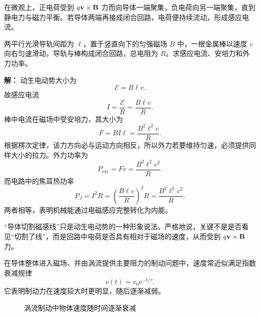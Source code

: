 \begin{center}
\end{center}

在微观上，正电荷受到 $q\vb{v}\times\vb{B}$ 力而向导体一端聚集，负电荷向另一端聚集，直到静电力与磁力平衡。若导体两端再接成闭合回路，电荷便持续流动，形成感应电流。

\begin{example}
两平行光滑导轨间距为 $\ell$，置于竖直向下的匀强磁场 $B$ 中，一根金属棒以速度 $v$ 向右匀速滑动，导轨与棒构成闭合回路，总电阻为 $R$。求感应电流、安培力和外力功率。

\textbf{解：} 动生电动势大小为
\[
\mathcal{E}=B\ell v.
\]
故感应电流
\[
I=\frac{\mathcal{E}}{R}=\frac{B\ell v}{R}.
\]
棒中电流在磁场中受安培力，其大小为
\[
F=B I \ell=\frac{B^2\ell^2 v}{R}.
\]
根据楞次定律，该力方向必与运动方向相反，所以外力若要维持匀速，必须提供同样大小的拉力。外力功率为
\[
P_{\text{ext}}=Fv=\frac{B^2\ell^2 v^2}{R}.
\]
而电路中的焦耳热功率
\[
P_J=I^2R=\left(\frac{B\ell v}{R}\right)^2R=\frac{B^2\ell^2 v^2}{R}.
\]
两者相等，表明机械能通过电磁感应完整转化为内能。
\end{example}

\begin{remark}
“导体切割磁感线”只是动生电动势的一种形象说法。严格地说，关键不是是否看见“切割了线”，而是回路中电荷是否具有相对于磁场的速度，从而受到 $q\vb{v}\times\vb{B}$ 力。
\end{remark}

在导体整体进入磁场、并由涡流提供主要阻力的制动问题中，速度常近似满足指数衰减规律
\[
v(t)=v_0\mathrm{e}^{-t/\tau}.
\]
它表明制动力在速度较大时更明显，随后逐渐减弱。

\begin{figure}[htbp]
\centering
{}
\caption{涡流制动中物体速度随时间逐渐衰减}
\end{figure}

